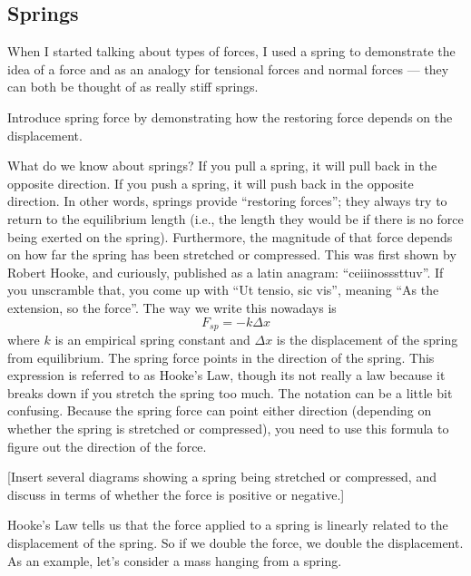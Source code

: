 
\subsection{Springs}
When I started talking about types of forces, I used a spring to demonstrate the idea of a force and as an analogy for tensional forces and normal forces --- they can both be thought of as really stiff springs.

Introduce spring force by demonstrating how the restoring force depends on the displacement.

What do we know about springs? If you pull a spring, it will pull back in the opposite direction. If you push a spring, it will push back in the opposite direction. In other words, springs provide ``restoring forces''; they always try to return to the equilibrium length (i.e., the length they would be if there is no force being exerted on the spring). Furthermore, the magnitude of that force depends on how far the spring has been stretched or compressed. This was first shown by Robert Hooke, and curiously, published as a latin anagram: ``ceiiinosssttuv''. If you unscramble that, you come up with ``Ut tensio, sic vis'', meaning ``As the extension, so the force''. The way we write this nowadays is
$$\boxed{F_{sp}=-k\Delta{x}}$$
where $k$ is an empirical spring constant and $\Delta{x}$ is the displacement of the spring from equilibrium. The spring force points in the direction of the spring. This expression is referred to as Hooke's Law, though its not really a law because it breaks down if you stretch the spring too much. The notation can be a little bit confusing. Because the spring force can point either direction (depending on whether the spring is stretched or compressed), you need to use this formula to figure out the direction of the force.

[Insert several diagrams showing a spring being stretched or compressed, and discuss in terms of whether the force is positive or negative.]
\vspace{8cm}

Hooke's Law tells us that the force applied to a spring is linearly related to the displacement of the spring. So if we double the force, we double the displacement. As an example, let's consider a mass hanging from a spring.

\vspace{5cm}

